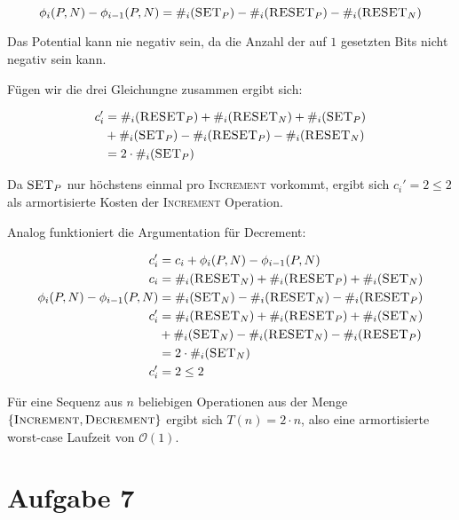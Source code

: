 \documentclass[parskip=half,a4paper]{scrartcl}
\begin{document}
\begin{equation}
\phi_i(P,N) - \phi_{i-1}(P,N) = \#_i(\textsc{SET}_P) - \#_i(\textsc{RESET}_P) - \#_i(\textsc{RESET}_N)
\end{equation}

Das Potential kann nie negativ sein, da die Anzahl der auf $1$ gesetzten Bits nicht negativ sein kann.

Fügen wir die drei Gleichungne zusammen ergibt sich:

\begin{equation}
\begin{aligned}
c_i' &= \#_i(\textsc{RESET}_P) + \#_i(\textsc{RESET}_N) + \#_i(\textsc{SET}_P) \\ &+ \#_i(\textsc{SET}_P) - \#_i(\textsc{RESET}_P) - \#_i(\textsc{RESET}_N)\\
&= 2 \cdot \#_i(\textsc{SET}_P)\\
\end{aligned}
\end{equation}

Da $\textsc{SET}_P$ nur höchstens einmal pro \textsc{Increment} vorkommt, ergibt sich $c_i' = 2 \le 2$ als armortisierte Kosten der \textsc{Increment} Operation.

Analog funktioniert die Argumentation für Decrement:

\begin{equation}
\begin{aligned}
c_i' &= c_i + \phi_i(P,N) - \phi_{i-1}(P,N)\\
c_i &= \#_i(\textsc{RESET}_N) + \#_i(\textsc{RESET}_P) + \#_i(\textsc{SET}_N)\\
\phi_i(P,N) - \phi_{i-1}(P,N) &= \#_i(\textsc{SET}_N) - \#_i(\textsc{RESET}_N) - \#_i(\textsc{RESET}_P)\\
c_i' &= \#_i(\textsc{RESET}_N) + \#_i(\textsc{RESET}_P) + \#_i(\textsc{SET}_N) \\ &+ \#_i(\textsc{SET}_N) - \#_i(\textsc{RESET}_N) - \#_i(\textsc{RESET}_P)\\
&= 2 \cdot \#_i(\textsc{SET}_N)\\
c_i' &= 2 \le 2
\end{aligned}
\end{equation}

Für eine Sequenz aus $n$ beliebigen Operationen aus der Menge $\{\textsc{Increment}, \textsc{Decrement}\}$ ergibt sich $T(n) = 2 \cdot n$, also eine armortisierte worst-case Laufzeit von $\mathcal{O}(1)$.

\section*{Aufgabe 7}
\end{document}
